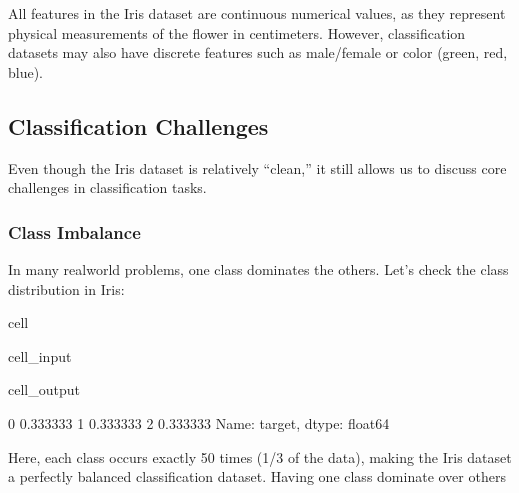 \documentclass[letterpaper,10pt,english]{jupyterBook}
\begin{document}
\sphinxAtStartPar
All features in the Iris dataset are continuous numerical values, as they represent physical measurements of the flower in centimeters. However, classification datasets may also have discrete features such as male/female or color (green, red, blue).


\subsection{Classification Challenges}
\label{\detokenize{classification_problem:classification-challenges}}
\sphinxAtStartPar
Even though the Iris dataset is relatively “clean,” it still allows us to discuss core challenges in classification tasks.


\subsubsection{Class Imbalance}
\label{\detokenize{classification_problem:class-imbalance}}
\sphinxAtStartPar
In many real\sphinxhyphen{}world problems, one class dominates the others. Let’s check the class distribution in Iris:

\begin{sphinxuseclass}{cell}\begin{sphinxVerbatimInput}

\begin{sphinxuseclass}{cell_input}
\begin{sphinxVerbatim}[commandchars=\\\{\}]
\end{sphinxVerbatim}

\end{sphinxuseclass}\end{sphinxVerbatimInput}
\begin{sphinxVerbatimOutput}

\begin{sphinxuseclass}{cell_output}
\begin{sphinxVerbatim}[commandchars=\\\{\}]
0    0.333333
1    0.333333
2    0.333333
Name: target, dtype: float64
\end{sphinxVerbatim}

\end{sphinxuseclass}\end{sphinxVerbatimOutput}

\end{sphinxuseclass}
\sphinxAtStartPar
Here, each class occurs exactly 50 times (1/3 of the data), making the Iris dataset a perfectly balanced classification dataset. Having one class dominate over others
\end{document}
